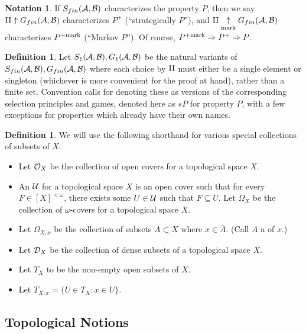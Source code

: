 \documentclass{amsart}
\theoremstyle{plain}
\theoremstyle{definition}
\newtheorem{definition}[theorem]{Definition}
\newtheorem{notation}[theorem]{Notation}
\theoremstyle{remark}
\theoremstyle{plain}
\theoremstyle{definition}
\theoremstyle{remark}
\begin{document}
\begin{notation}
 If \(S_{fin}(\mathcal{A},\mathcal{B})\) characterizes the property \(P\), then we say \(\mathrm{II}\uparrow G_{fin}(\mathcal{A},\mathcal{B})\) characterizes \(P^+\) (``strategically \(P\)''), and \(\mathrm{II}\underset{\text{mark}}{\uparrow}G_{fin}(\mathcal{A},\mathcal{B})\) characterizes \(P^{+\mathrm{mark}}\) (``Markov \(P\)'').
 Of course, \(P^{+\mathrm{mark}}\Rightarrow P^+ \Rightarrow P\).
\end{notation}

\begin{definition}
 Let \(S_{1}(\mathcal{A},\mathcal{B}),G_{1}(\mathcal{A},\mathcal{B})\) be the natural variants of \(S_{fin}(\mathcal{A},\mathcal{B}),G_{fin}(\mathcal{A},\mathcal{B})\) where each choice by \(\mathrm{II}\) must either be a single element or singleton (whichever is more convenient for the proof at hand), rather than a finite set.
 Convention calls for denoting these as  versions of the corresponding selection principles and games, denoted here as \(sP\) for property \(P\), with a few exceptions for properties which already have their own names.
\end{definition}

\begin{definition}
 We will use the following shorthand for various special collections of subsets of \(X\).
  \begin{itemize}
   \item Let \(\mathcal{O}_X\) be the collection of open covers for a topological space   \(X\).
   \item An  \(\mathcal{U}\)   for a topological space \(X\) is an open cover   such that for every \(F\in[X]^{<\omega}\), there exists some \(U\in\mathcal{U}\)   such that \(F\subseteq U\). Let \(\Omega_X\) be the collection of \(\omega\)-covers for a topological   space \(X\).
   \item Let \(\Omega_{X,x}\) be the collection of subsets \(A\subset X\) where   \(x\in \overline{A}\). (Call \(A\) a  of \(x\).)
   \item Let \(\mathcal{D}_{X}\) be the collection of dense subsets of a topological   space \(X\).
   \item Let \(T_X\) to be the non-empty open subsets of \(X\).
   \item Let \(T_{X,x} = \{U \in T_X : x \in U\}\).
  \end{itemize}
\end{definition}

\subsection{Topological Notions}
\end{document}
